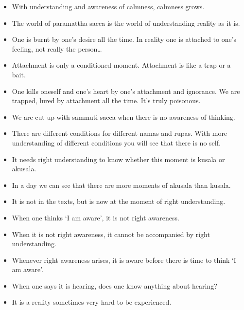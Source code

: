 \documentclass{article}
\begin{document}
\begin{itemize}
\item 
  With understanding and awareness of calmness, calmness grows.

\item 
  The world of paramattha sacca is the world of understanding reality
  as it is.

\item 
  One is burnt by one's desire all the time. In reality one is
  attached to one's feeling, not really the person\ldots{}

\item 
  Attachment is only a conditioned moment. Attachment is like a trap
  or a bait.

\item 
  One kills oneself and one's heart by one's attachment and
  ignorance. We are trapped, lured by attachment all the time. It's
  truly poisonous.

\item 
  We are cut up with sammuti sacca when there is no awareness of
  thinking.

\item 
  There are different conditions for different namas and rupas. With
  more understanding of different conditions you will see that there
  is no self.

\item 
  It needs right understanding to know whether this moment is kusala
  or akusala.

\item 
  In a day we can see that there are more moments of akusala than
  kusala.

\item 
  It is not in the texts, but is now at the moment of right
  understanding.

\item 
  When one thinks `I am aware', it is not right awareness.

\item 
  When it is not right awareness, it cannot be accompanied by right
  understanding.

\item 
  Whenever right awareness arises, it is aware before there is time
  to think `I am aware'.

\item 
  When one says it is hearing, does one know anything about hearing?

\item 
  It is a reality sometimes very hard to be experienced.


\end{itemize}
\end{document}

